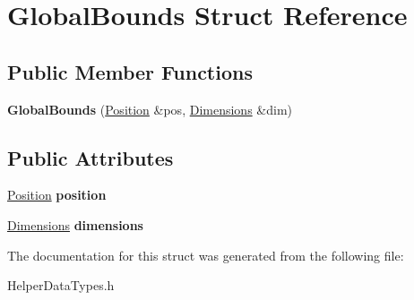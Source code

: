 \hypertarget{struct_global_bounds}{}\section{Global\+Bounds Struct Reference}
\label{struct_global_bounds}
\subsection*{Public Member Functions}
\begin{DoxyCompactItemize}
\item 
\mbox{\label{struct_global_bounds_a38d87fc7f3c34bff62bd744ac9fc3724}} 
{\bfseries Global\+Bounds} (\hyperlink{struct_position}{Position} \&pos, \hyperlink{struct_dimentions}{Dimensions} \&dim)
\end{DoxyCompactItemize}
\subsection*{Public Attributes}
\begin{DoxyCompactItemize}
\item 
\mbox{\label{struct_global_bounds_a6224bede2eff12cec85b6999b7faedc3}} 
\hyperlink{struct_position}{Position} {\bfseries position}
\item 
\mbox{\label{struct_global_bounds_a1fb273eb005424a1d6ff34d3808c7081}} 
\hyperlink{struct_dimentions}{Dimensions} {\bfseries dimensions}
\end{DoxyCompactItemize}


The documentation for this struct was generated from the following file\+:\begin{DoxyCompactItemize}
\item 
Helper\+Data\+Types.\+h\end{DoxyCompactItemize}
